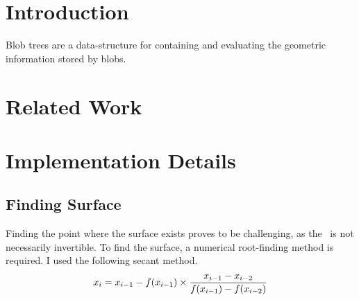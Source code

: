 \documentclass[conference]{acmsiggraph}
\title{\Title}
\author{
	\Author \\
	University of Victoria\\
\Email}
\begin{document}

\maketitle

\begin{abstract}
	Implicit surfaces are a mathematical representation of geometric
	information; storing complex geometric information with minimal memory
	requirements. Blobs are a form of implicit object defined by a central
	origin point, a \fff, and an iso value. The surface is defined at
	radius $r$ when the \fff evaluated on $r$ is equal to the iso value.

	A blob tree is used to build complex geometry from simpler
	primitives. Intelligent construction of the blob-tree is critical for
	fast evaluation of the implicit object represented in the tree, whether
	that be for ray-tracing or polygonization.

\end{abstract}

\keywordlist

\copyrightspace

\section{Introduction}
Blob trees are a data-structure for containing and evaluating the geometric
information stored by blobs.
\section{Related Work}
\section{Implementation Details}
\subsection{Finding Surface}
Finding the point where the surface exists proves to be challenging, as the
\fff\ is not necessarily invertible. To find the surface, a numerical
root-finding method is required. I used the following secant method.
$$x_i = x_{i-1} - f(x_{i-1}) \times {x_{i-1} - x_{i-2} \over f(x_{i-1}) -
f(x_{i-2})}$$
\end{document}
